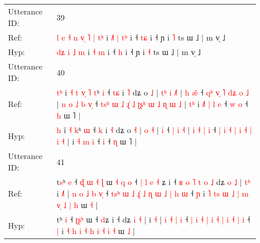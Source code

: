 \documentclass[10pt]{article}
\DeclareRobustCommand{\hl}[1]{{\textcolor{red}{#1}}}
\begin{document}
\begin{longtable}{ll}
 \\
\midrule
Utterance ID: & 39 \\
Ref: & \hl{l}\hl{ }\hl{e}\hl{ }\hl{˧}\hl{ }\hl{n}\hl{ }\hl{v}\hl{̩} \hl{˥} \hl{|} \hl{t}\hl{ʰ} i\hl{ }\hl{˩}\hl{˥} \hl{|} \hl{t}\hl{ʰ} i ˧ \hl{t}\hl{ɕ} i ˧ ɲ i \hl{˥} ts ɯ ˩ | m v̩ ˩
 \\
Hyp: & \hl{}\hl{}\hl{}\hl{}\hl{}\hl{}\hl{}\hl{}\hl{d}\hl{ʑ} \hl{i} \hl{˩} \hl{}\hl{m} i\hl{}\hl{}\hl{} \hl{˧} \hl{}\hl{m} i ˧ \hl{}\hl{h} i ˧ ɲ i \hl{˧} ts ɯ ˩ | m v̩ ˩
 \\
\midrule
Utterance ID: & 40 \\
Ref: & \hl{t}\hl{ʰ} i\hl{ }\hl{˧}\hl{ }\hl{t}\hl{ }\hl{v}\hl{̩} \hl{˥} \hl{t}ʰ \hl{i} ˧ \hl{t}\hl{ɕ} i \hl{˥} dʑ o \hl{˩} |\hl{ }\hl{t}\hl{ʰ} \hl{i} \hl{˩}\hl{˥} |\hl{ }\hl{h} \hl{æ}\hl{̃} ˧\hl{ }\hl{q}\hl{ʰ}\hl{ }\hl{v}\hl{̩}\hl{ }\hl{˥} \hl{d}\hl{ʑ} \hl{o} \hl{˩} |\hl{ }\hl{n} \hl{o} \hl{˩} \hl{b} \hl{v}\hl{̩} ˧\hl{ }\hl{t}\hl{s}\hl{ʰ}\hl{ }\hl{ɯ} \hl{˩} \hl{ɻ}\hl{̍} \hl{˩} \hl{ʈ}\hl{ʂ}\hl{ʰ} \hl{ɯ} \hl{˩} \hl{ɳ} \hl{ɯ} \hl{˩} |\hl{ }\hl{t}\hl{ʰ} i\hl{ }\hl{˩}\hl{˥} \hl{|} \hl{l} \hl{e} ˧\hl{ }\hl{w} \hl{o} ˧ \hl{h} ɯ ˥ |
 \\
Hyp: & \hl{}\hl{h} i\hl{}\hl{}\hl{}\hl{}\hl{}\hl{}\hl{̃} \hl{˧} \hl{k}ʰ \hl{ɯ} ˧ \hl{}\hl{k} i \hl{˧} dʑ o \hl{˧} |\hl{}\hl{}\hl{} \hl{o} \hl{}\hl{˧} |\hl{}\hl{} \hl{}\hl{i} ˧\hl{}\hl{}\hl{}\hl{}\hl{}\hl{}\hl{}\hl{} \hl{}\hl{|} \hl{i} \hl{˧} |\hl{}\hl{} \hl{i} \hl{˧} \hl{|} \hl{}\hl{i} ˧\hl{}\hl{}\hl{}\hl{}\hl{}\hl{} \hl{|} \hl{}\hl{i} \hl{˧} \hl{}\hl{}\hl{|} \hl{i} \hl{˧} \hl{|} \hl{i} \hl{˧} |\hl{}\hl{}\hl{} i\hl{}\hl{}\hl{} \hl{˧} \hl{m} \hl{i} ˧\hl{}\hl{} \hl{i} ˧ \hl{ɳ} ɯ ˥ |
 \\
\midrule
Utterance ID: & 41 \\
Ref: & t\hl{s}ʰ \hl{e} ˧\hl{ }\hl{ɖ}\hl{ }\hl{ɯ} \hl{˧}\hl{ }\hl{ɭ} ɯ\hl{ }\hl{˧}\hl{ }\hl{q}\hl{ }\hl{o} ˧\hl{ }\hl{|}\hl{ }\hl{l}\hl{ }\hl{e} \hl{˧}\hl{ }ʑ i ˧\hl{ }\hl{ʁ}\hl{ }\hl{o}\hl{ }\hl{˥}\hl{ }\hl{t}\hl{ }\hl{o}\hl{ }\hl{˩} dʑ \hl{o} \hl{˩} |\hl{ }\hl{t}\hl{ʰ} i \hl{˩}\hl{˥} |\hl{ }\hl{n} \hl{o} \hl{˩} \hl{b} \hl{v}\hl{̩} ˧ \hl{t}\hl{s}\hl{ʰ} \hl{ɯ} \hl{˩} \hl{ɻ}\hl{̍} \hl{˩} \hl{ɳ} \hl{ɯ} \hl{˩} \hl{|} \hl{h} \hl{ɯ} ˧ \hl{ɲ} i\hl{ }\hl{˥} \hl{t}\hl{s} \hl{ɯ} \hl{˩} \hl{|} \hl{m} \hl{v}\hl{̩} \hl{˩} \hl{|} \hl{h} ɯ \hl{˧} |
 \\
Hyp: & t\hl{}ʰ \hl{i} ˧\hl{}\hl{}\hl{}\hl{} \hl{ʈ}\hl{ʂ}\hl{ʰ} ɯ\hl{}\hl{}\hl{}\hl{}\hl{}\hl{} ˧\hl{}\hl{}\hl{}\hl{}\hl{}\hl{} \hl{}\hl{d}ʑ i ˧\hl{}\hl{}\hl{}\hl{}\hl{}\hl{}\hl{}\hl{}\hl{}\hl{}\hl{}\hl{} dʑ \hl{i} \hl{˧} |\hl{}\hl{}\hl{} i \hl{}\hl{˧} |\hl{}\hl{} \hl{i} \hl{˧} \hl{|} \hl{}\hl{i} ˧ \hl{}\hl{}\hl{|} \hl{i} \hl{˧} \hl{}\hl{|} \hl{i} \hl{˧} \hl{|} \hl{i} \hl{˧} \hl{|} \hl{i} ˧ \hl{|} i\hl{}\hl{} \hl{}\hl{˧} \hl{h} \hl{i} \hl{˧} \hl{h} \hl{}\hl{i} \hl{˧} \hl{i} \hl{˧} ɯ \hl{˩} |

\end{longtable}
\end{document}
